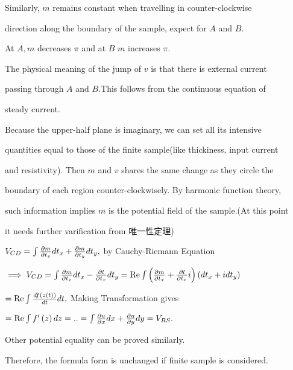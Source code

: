 \documentclass{ctexart}
\def\func#1{\mathop{\rm #1}}%
\begin{document}
Similarly, $m$ remains constant when travelling in counter-clockwise

direction along the boundary of the sample, expect for $A$ and $B.$

At $A,m$ decreases $\pi $ and at $B$ $m$ increases $\pi .$

The physical meaning of the jump of $v$ is that there is external current

passing through $A$ and $B.$This follows from the continuous equation of 

steady current.

Because the upper-half plane is imaginary, we can set all its intensive 

quantities equal to those of the finite sample(like thickiness, input current

and resistivity). Then $m$ and $v$ shares the same change as they circle the 

boundary of each region counter-clockwisely. By harmonic function theory,

such information implies $m$ is the potential field of the sample.(At this
point

it needs further varification from 唯一性定理)

$V_{CD}=\int \frac{\partial m}{\partial t_{x}}dt_{x}+\frac{\partial m}{%
\partial t_{y}}dt_{y},$ by Cauchy-Riemann Equation

$\implies V_{CD}=\int \frac{\partial m}{\partial t_{x}}dt_{x}-\frac{\partial
l}{\partial t_{x}}dt_{y}=\func{Re}\int \left( \frac{\partial m}{\partial
t_{x}}+\frac{\partial l}{\partial t_{x}}i\right) \left(
dt_{x}+idt_{y}\right) $

$=\func{Re}\int \frac{df\left( z\left( t\right) \right) }{dt}dt,$ Making
Transformation gives

$=\func{Re}\int f^{\prime }\left( z\right) dz=..=\int \frac{\partial u}{%
\partial x}dx+\frac{\partial u}{\partial y}dy=V_{RS}.$

Other potential equality can be proved similarly.

Therefore, the formula form is unchanged if finite sample is considered.
\end{document}
